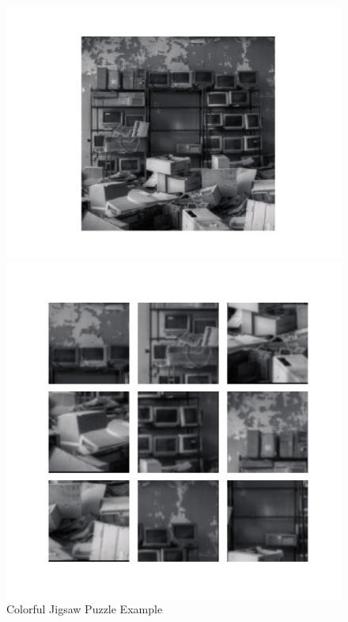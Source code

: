 \documentclass{article}
\begin{document}
\begin{figure}
\begin{minipage}{\textwidth}
\begin{minipage}{.49\textwidth}
\begin{minipage}{.49\textwidth}
            \end{minipage}
            \caption{Colorful Jigsaw Puzzle Example}
            \label{fig:colorfuljigsawpuzzle}
        \end{minipage}
        \begin{minipage}{.49\textwidth}
            \begin{minipage}{.49\textwidth}
                \centering
                \includegraphics[width=\textwidth]{origin_black}
            \end{minipage}
            \begin{minipage}{.49\textwidth}
                \centering
                \includegraphics[width=\textwidth]{puzzle_black}

\end{minipage}
\end{minipage}
\end{minipage}
\end{figure}
\end{document}
